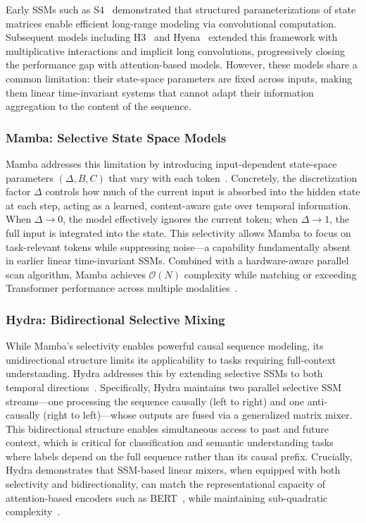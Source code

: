 \documentclass[conference]{IEEEtran}
\begin{document}
Early SSMs such as S4~\cite{Gu2021S4} demonstrated that structured parameterizations of state matrices enable efficient long-range modeling via convolutional computation. Subsequent models including H3~\cite{Fu2022H4} and Hyena~\cite{Poli2023Hyena} extended this framework with multiplicative interactions and implicit long convolutions, progressively closing the performance gap with attention-based models. However, these models share a common limitation: their state-space parameters are fixed across inputs, making them linear time-invariant systems that cannot adapt their information aggregation to the content of the sequence.

\subsubsection{Mamba: Selective State Space Models}

Mamba addresses this limitation by introducing input-dependent state-space parameters $(\Delta, B, C)$ that vary with each token~\cite{Gu2023Mamba}. Concretely, the discretization factor $\Delta$ controls how much of the current input is absorbed into the hidden state at each step, acting as a learned, content-aware gate over temporal information. When $\Delta \to 0$, the model effectively ignores the current token; when $\Delta \to 1$, the full input is integrated into the state. This selectivity allows Mamba to focus on task-relevant tokens while suppressing noise—a capability fundamentally absent in earlier linear time-invariant SSMs. Combined with a hardware-aware parallel scan algorithm, Mamba achieves $\mathcal{O}(N)$ complexity while matching or exceeding Transformer performance across multiple modalities~\cite{Gu2023Mamba}.

\subsubsection{Hydra: Bidirectional Selective Mixing}

While Mamba's selectivity enables powerful causal sequence modeling, its unidirectional structure limits its applicability to tasks requiring full-context understanding. Hydra addresses this by extending selective SSMs to both temporal directions~\cite{Hwang2024Hydra}. Specifically, Hydra maintains two parallel selective SSM streams—one processing the sequence causally (left to right) and one anti-causally (right to left)—whose outputs are fused via a generalized matrix mixer. This bidirectional structure enables simultaneous access to past and future context, which is critical for classification and semantic understanding tasks where labels depend on the full sequence rather than its causal prefix. Crucially, Hydra demonstrates that SSM-based linear mixers, when equipped with both selectivity and bidirectionality, can match the representational capacity of attention-based encoders such as BERT~\cite{devlin2019bert}, while maintaining sub-quadratic complexity~\cite{Hwang2024Hydra}.
\end{document}
